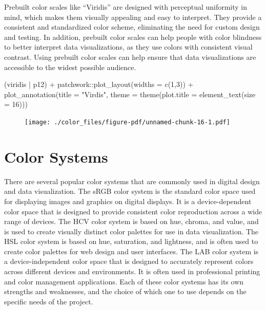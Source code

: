 \documentclass[
  letterpaper,
]{book}
\newenvironment{Shaded}{\begin{snugshade}}{\end{snugshade}}
\newcommand{\AttributeTok}[1]{\textcolor[rgb]{0.40,0.45,0.13}{#1}}
\newcommand{\DecValTok}[1]{\textcolor[rgb]{0.68,0.00,0.00}{#1}}
\newcommand{\FunctionTok}[1]{\textcolor[rgb]{0.28,0.35,0.67}{#1}}
\newcommand{\NormalTok}[1]{\textcolor[rgb]{0.00,0.23,0.31}{#1}}
\newcommand{\SpecialCharTok}[1]{\textcolor[rgb]{0.37,0.37,0.37}{#1}}
\newcommand{\StringTok}[1]{\textcolor[rgb]{0.13,0.47,0.30}{#1}}
\begin{document}
Prebuilt color scales like ``Viridis'' are designed with perceptual
uniformity in mind, which makes them visually appealing and easy to
interpret. They provide a consistent and standardized color scheme,
eliminating the need for custom design and testing. In addition,
prebuilt color scales can help people with color blindness to better
interpret data visualizations, as they use colors with consistent visual
contrast. Using prebuilt color scales can help ensure that data
visualizations are accessible to the widest possible audience.

\begin{Shaded}
\begin{Highlighting}[]
\NormalTok{(viridis }\SpecialCharTok{|}\NormalTok{ p12) }\SpecialCharTok{+} 
\NormalTok{  patchwork}\SpecialCharTok{::}\FunctionTok{plot\_layout}\NormalTok{(}\AttributeTok{widths =} \FunctionTok{c}\NormalTok{(}\DecValTok{1}\NormalTok{,}\DecValTok{3}\NormalTok{)) }\SpecialCharTok{+} 
  \FunctionTok{plot\_annotation}\NormalTok{(}\AttributeTok{title =} \StringTok{"Virdis"}\NormalTok{,}
                  \AttributeTok{theme =} \FunctionTok{theme}\NormalTok{(}\AttributeTok{plot.title =} \FunctionTok{element\_text}\NormalTok{(}\AttributeTok{size =} \DecValTok{16}\NormalTok{)))}
\end{Highlighting}
\end{Shaded}

\begin{figure}[H]

{\centering \texttt{[image: ./color\_files/figure-pdf/unnamed-chunk-16-1.pdf]}

}

\end{figure}

\hypertarget{color-systems}{%
\section{Color Systems}\label{color-systems}}

There are several popular color systems that are commonly used in
digital design and data visualization. The sRGB color system is the
standard color space used for displaying images and graphics on digital
displays. It is a device-dependent color space that is designed to
provide consistent color reproduction across a wide range of devices.
The HCV color system is based on hue, chroma, and value, and is used to
create visually distinct color palettes for use in data visualization.
The HSL color system is based on hue, saturation, and lightness, and is
often used to create color palettes for web design and user interfaces.
The LAB color system is a device-independent color space that is
designed to accurately represent colors across different devices and
environments. It is often used in professional printing and color
management applications. Each of these color systems has its own
strengths and weaknesses, and the choice of which one to use depends on
the specific needs of the project.
\end{document}
